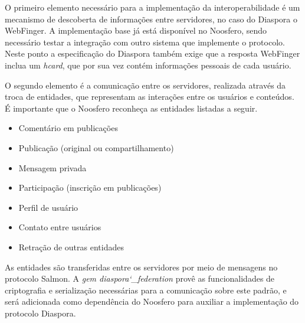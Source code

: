 
O primeiro elemento necessário para a implementação da interoperabilidade é um
mecanismo de descoberta de informações entre servidores, no caso do Diaspora o
WebFinger. A implementação base já está disponível no Noosfero, sendo necessário
testar a integração com outro sistema que implemente o protocolo. Neste ponto a
especificação do Diaspora também exige que a resposta WebFinger inclua um
\textit{hcard}, que por sua vez contém informações pessoais de cada usuário.

O segundo elemento é a comunicação entre os servidores, realizada através da troca
de entidades, que representam as interações entre os usuários e conteúdos. É
importante que o Noosfero reconheça as entidades listadas a seguir.

\begin{itemize}
  \item{Comentário em publicações}
  \item{Publicação (original ou compartilhamento)}
  \item{Mensagem privada}
  \item{Participação (inscrição em publicações)}
  \item{Perfil de usuário}
  \item{Contato entre usuários}
  \item{Retração de outras entidades}
\end{itemize}

As entidades são transferidas entre os servidores por meio de mensagens no protocolo
Salmon. A \textit{gem diaspora\char`_federation} provê as funcionalidades de criptografia
e serialização necessárias para a comunicação sobre este padrão, e será adicionada
como dependência do Noosfero para auxiliar a implementação do protocolo Diaspora.

